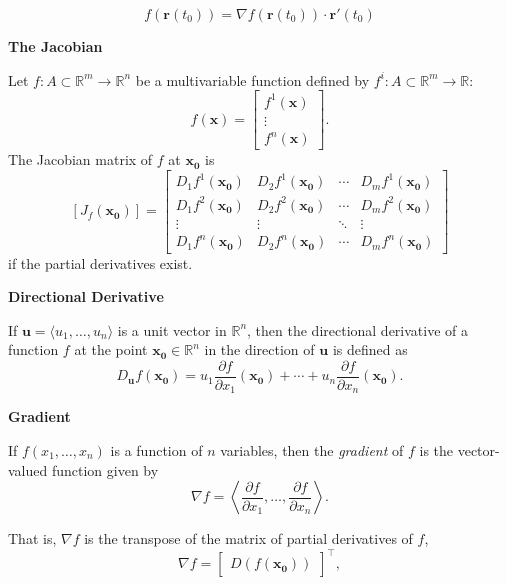 \documentclass{article}
\newcommand{\R}{\mathbb{R}}
\begin{document}
\[ f(\mathbf{r}(t_0)) = \nabla f(\mathbf{r}(t_0)) \cdot \mathbf{r}'(t_0) \]


\vspace{0.5cm}

\noindent \textbf{The Jacobian}


Let \( f : A \subset \R^m \rightarrow \R^n \) be a multivariable function defined by \( f^i : A \subset \R^m \rightarrow \R \):
\[
f(\bm{x}) =
\begin{bmatrix}
    f^1(\bm{x}) \\
    \vdots \\
    f^n(\bm{x})
\end{bmatrix}.
\]
The Jacobian matrix of \( f \) at \( \bm{x_0} \) is
\[
[J_f (\bm{x_0})] =
\begin{bmatrix}
    D_1f^1(\bm{x_0}) & D_2f^1(\bm{x_0}) & \cdots & D_mf^1(\bm{x_0}) \\
    D_1f^2(\bm{x_0}) & D_2f^2(\bm{x_0}) & \cdots & D_mf^2(\bm{x_0}) \\
    \vdots & \vdots & \ddots & \vdots \\
    D_1f^n(\bm{x_0}) & D_2f^n(\bm{x_0}) & \cdots & D_mf^n(\bm{x_0})
\end{bmatrix}
\]
if the partial derivatives exist.



\vspace{0.5cm}

\noindent \textbf{Directional Derivative}

If \( \mathbf{u} = \langle u_1, \ldots, u_n \rangle \) is a unit vector in \( \mathbb{R}^n \), then the directional derivative of a function \( f \) at the point \( \mathbf{x_0} \in \mathbb{R}^n \) in the direction of \( \mathbf{u} \) is defined as
\[ D_{\mathbf{u}}f(\mathbf{x_0}) = u_1 \frac{\partial f}{\partial x_1}(\mathbf{x_0}) + \cdots + u_n \frac{\partial f}{\partial x_n}(\mathbf{x_0}). \]

\vspace{0.5cm}

\noindent \textbf{Gradient}

If \( f(x_1, \ldots, x_n) \) is a function of \( n \) variables, then the \textit{gradient} of \( f \) is the vector-valued function given by
\[ \nabla f = \left\langle \frac{\partial f}{\partial x_1}, \ldots, \frac{\partial f}{\partial x_n} \right\rangle. \]

That is, \( \nabla f \) is the transpose of the matrix of partial derivatives of \( f \),
\[ \nabla f = \begin{bmatrix} D(f\left(\bm{x_0}\right)) \end{bmatrix}^{\top}, \]
\end{document}
